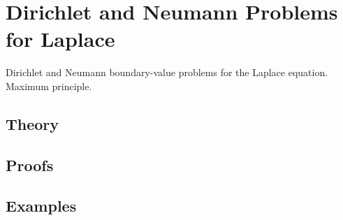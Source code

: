 
\section{Dirichlet and Neumann Problems for Laplace}
\label{sec:2.1.04-elliptic-laplace}

\begin{ticket}
Dirichlet and Neumann boundary-value problems for the Laplace equation. Maximum principle.
\end{ticket}

\subsection*{Theory}

\subsection*{Proofs}

\subsection*{Examples}
